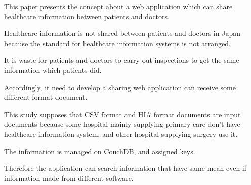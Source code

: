 This paper presents the concept about a web application which can share healthcare information between patients and doctors.

Healthcare information is not shared between patients and doctors in Japan
because the standard for healthcare information systems is not arranged.



It is waste for patients and doctors to carry out inspections to get  the same information which patients did.

Accordingly, it need to develop a sharing web application can receive some different format document.

This study supposes that CSV format and HL7 format documents are input documents because some hospital mainly supplying primary care don't have healthcare information system, and other hospital supplying surgery use it.

The information is managed on CouchDB, and assigned keys.

Therefore the application can search information that have same mean even if information made from different software.
